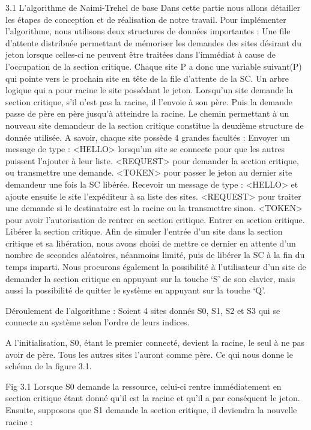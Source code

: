 \documentclass[a4paper,french,towsides,10pt]{book}
\begin{document}
3.1 L’algorithme de Naimi-Trehel de base
Dans cette partie nous allons détailler les étapes de conception et de réalisation de notre travail.
Pour implémenter l’algorithme, nous utilisons deux structures de données importantes :
Une file d’attente distribuée permettant de mémoriser les demandes des sites désirant du jeton lorsque celles-ci ne peuvent être traitées dans l’immédiat à cause de l’occupation de la section critique. Chaque site P a donc une variable suivant(P) qui pointe vers le prochain site en tête de la file d’attente de la SC.
Un arbre logique qui a pour racine le site possédant le jeton. Lorsqu’un site demande la section critique, s’il n’est pas la racine, il l’envoie à son père. Puis la demande passe de père en père jusqu’à atteindre la racine. Le chemin permettant à un nouveau site demandeur de la section critique constitue la deuxième structure de donnée utilisée.
A savoir, chaque site possède 4 grandes facultés :
Envoyer un message de type :
<HELLO> lorsqu’un site se connecte pour que les autres puissent l’ajouter à leur liste.
<REQUEST> pour demander la section critique, ou transmettre une demande.
<TOKEN> pour passer le jeton au dernier site demandeur une fois la SC libérée.
Recevoir un message de type :
<HELLO> et ajoute ensuite le site l’expéditeur à sa liste des sites.
<REQUEST> pour traiter une demande si le destinataire est la racine ou la transmettre sinon.
<TOKEN> pour avoir l’autorisation de rentrer en section critique.
Entrer en section critique.
Libérer la section critique.
Afin de simuler l’entrée d’un site dans la section critique et sa libération, nous avons choisi de mettre ce dernier en attente d’un nombre de secondes aléatoires, néanmoins limité, puis de libérer la SC à la fin du temps imparti.
Nous procurons également la possibilité à l’utilisateur d’un site de demander la section critique en appuyant sur la touche ‘S’ de son clavier, mais aussi la possibilité de quitter le système en appuyant sur la touche ‘Q’.

Déroulement de l’algorithme :
Soient 4 sites donnés S0, S1, S2 et S3 qui se connecte au système selon l’ordre de leurs indices.

A l’initialisation, S0, étant le premier connecté, devient la racine, le seul à ne pas avoir de père. Tous les autres sites l’auront comme père. Ce qui nous donne le schéma de la figure 3.1.

Fig 3.1
Lorsque S0 demande la ressource, celui-ci rentre immédiatement en section critique étant donné qu’il est la racine et qu’il a par conséquent le jeton.
Ensuite, supposons que S1 demande la section critique, il deviendra la nouvelle racine :
\end{document}
